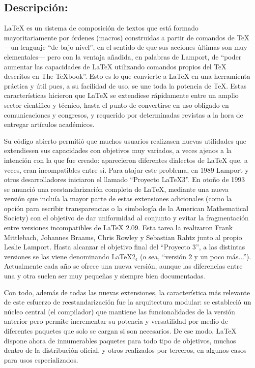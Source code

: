 \documentclass[12pt,a4paper,spanish]{book}
\begin{document}
\subsection{Descripci\'on:}
\LaTeX{} es un sistema de composici\'on de textos que est\'a formado mayoritariamente por \'ordenes (macros) construidas a partir de comandos de \TeX{} ---un lenguaje ``de bajo nivel'', en el sentido de que sus acciones \'ultimas son muy elementales--- pero con la ventaja a\~nadida, en palabras de Lamport, de ``poder aumentar las capacidades de \LaTeX{} utilizando comandos propios del \TeX{} descritos en The TeXbook''. Esto es lo que convierte a \LaTeX{} en una herramienta pr\'actica y \'util pues, a su facilidad de uso, se une toda la potencia de \TeX{}. Estas caracter\'isticas hicieron que \LaTeX{} se extendiese r\'apidamente entre un amplio sector cient\'ifico y t\'ecnico, hasta el punto de convertirse en uso obligado en comunicaciones y congresos, y requerido por determinadas revistas a la hora de entregar art\'iculos acad\'emicos.

Su c\'odigo abierto permiti\'o que muchos usuarios realizasen nuevas utilidades que extendiesen sus capacidades con objetivos muy variados, a veces ajenos a la intenci\'on con la que fue creado: aparecieron diferentes dialectos de \LaTeX{} que, a veces, eran incompatibles entre s\'i. Para atajar este problema, en 1989 Lamport y otros desarrolladores iniciaron el llamado ``Proyecto LaTeX3''. En oto\~no de 1993 se anunci\'o una reestandarizaci\'on completa de \LaTeX{}, mediante una nueva versi\'on que inclu\'ia la mayor parte de estas extensiones adicionales (como la opci\'on para escribir transparencias o la simbolog\'ia de la American Mathematical Society) con el objetivo de dar uniformidad al conjunto y evitar la fragmentaci\'on entre versiones incompatibles de \LaTeX{} 2.09. Esta tarea la realizaron Frank Mittlebach, Johannes Braams, Chris Rowley y Sebastian Rahtz junto al propio Leslie Lamport. Hasta alcanzar el objetivo final del ``Proyecto 3'', a las distintas versiones se las viene denominando \LaTeX{}$2_\epsilon$ (o sea, ``versi\'on 2 y un poco m\'as...''). Actualmente cada a\~no se ofrece una nueva versi\'on, aunque las diferencias entre una y otra suelen ser muy peque\~nas y siempre bien documentadas.

Con todo, adem\'as de todas las nuevas extensiones, la caracter\'istica m\'as relevante de este esfuerzo de reestandarizaci\'on fue la arquitectura modular: se estableci\'o un n\'ucleo central (el compilador) que mantiene las funcionalidades de la versi\'on anterior pero permite incrementar su potencia y versatilidad por medio de diferentes paquetes que solo se cargan si son necesarios. De ese modo, \LaTeX{} dispone ahora de innumerables paquetes para todo tipo de objetivos, muchos dentro de la distribuci\'on oficial, y otros realizados por terceros, en algunos casos para usos especializados.
\end{document}
